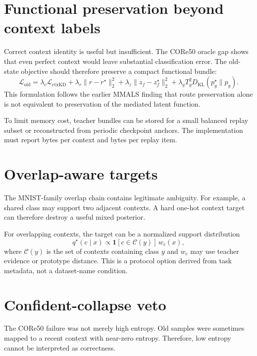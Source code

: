 \documentclass[10pt]{article}
\newcommand{\mmals}{\textsc{MMALS}}
\begin{document}
\section{Functional preservation beyond context labels}
Correct context identity is useful but insufficient. The CORe50 oracle gap shows that even perfect context would leave substantial classification error. The old-state objective should therefore preserve a compact functional bundle:
\begin{equation}
\mathcal{L}_{\mathrm{old}}
=
\lambda_c\mathcal{L}_{\mathrm{ctxKD}}
+
\lambda_r\lVert r-r^{\star}\rVert_2^2
+
\lambda_z\lVert z_f-z_f^{\star}\rVert_2^2
+
\lambda_y T_y^2D_{\mathrm{KL}}(p^{\star}_y\parallel p_y).
\end{equation}
This formulation follows the earlier \mmals{} finding that route preservation alone is not equivalent to preservation of the mediated latent function.

To limit memory cost, teacher bundles can be stored for a small balanced replay subset or reconstructed from periodic checkpoint anchors. The implementation must report bytes per context and bytes per replay item.

\section{Overlap-aware targets}
The MNIST-family overlap chain contains legitimate ambiguity. For example, a shared class may support two adjacent contexts. A hard one-hot context target can therefore destroy a useful mixed posterior.

For overlapping contexts, the target can be a normalized support distribution
\begin{equation}
q^{\star}(c\mid x)
\propto
\mathbf{1}[c\in\mathcal{C}(y)]\,w_c(x),
\end{equation}
where $\mathcal{C}(y)$ is the set of contexts containing class $y$ and $w_c$ may use teacher evidence or prototype distance. This is a protocol option derived from task metadata, not a dataset-name condition.

\begin{table}[H]
\centering
\caption{Compatibility implications across current benchmark families.}

\end{table}

\section{Confident-collapse veto}
The CORe50 failure was not merely high entropy. Old samples were sometimes mapped to a recent context with near-zero entropy. Therefore, low entropy cannot be interpreted as correctness.
\end{document}
